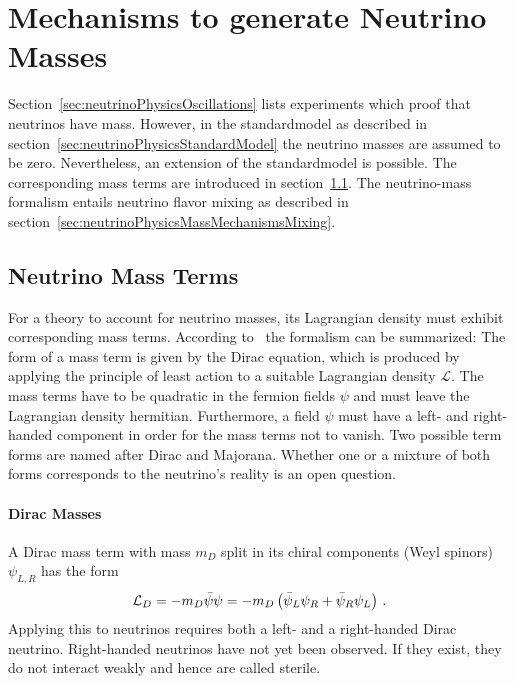 \section{Mechanisms to generate Neutrino Masses}
\label{sec:neutrinoPhysicsMassMechanisms}
Section~\ref{sec:neutrinoPhysicsOscillations} lists experiments which proof that neutrinos have mass. However, in the \gls{standardmodel} as described in section~\ref{sec:neutrinoPhysicsStandardModel} the neutrino masses are assumed to be zero. Nevertheless, an extension of the \gls{standardmodel} is possible. The corresponding mass terms are introduced in section~\ref{sec:neutrinoPhysicsMassMechanismsTerms}. The neutrino-mass formalism entails neutrino flavor mixing as described in section~\ref{sec:neutrinoPhysicsMassMechanismsMixing}.

\subsection{Neutrino Mass Terms}
\label{sec:neutrinoPhysicsMassMechanismsTerms}
For a theory to account for neutrino masses, its Lagrangian density must exhibit corresponding mass terms. According to~\cite{zuber2011neutrino} the formalism can be summarized: The form of a mass term is given by the Dirac equation, which is produced by applying the principle of least action to a suitable Lagrangian density $\mathcal{L}$. The mass terms have to be quadratic in the fermion fields $\psi$ and must leave the Lagrangian density hermitian. Furthermore, a field $\psi$ must have a left- and right-handed component in order for the mass terms not to vanish. Two possible term forms are named after Dirac and Majorana. Whether one or a mixture of both forms corresponds to the neutrino's reality is an open question.

\paragraph{Dirac Masses}
A Dirac mass term with mass $m_D$ split in its chiral components (Weyl spinors) $\psi_{L,R}$ has the form~\cite{zuber2011neutrino}
\begin{equation}
\mathcal{L}_D =  -m_D \bar\psi\psi = -m_D \left(\bar\psi_L\psi_R + \bar\psi_R\psi_L \right) \text{\,.}
\end{equation}
Applying this to neutrinos requires both a left- and a right-handed Dirac neutrino. Right-handed neutrinos have not yet been observed. If they exist, they do not interact weakly and hence are called sterile.


